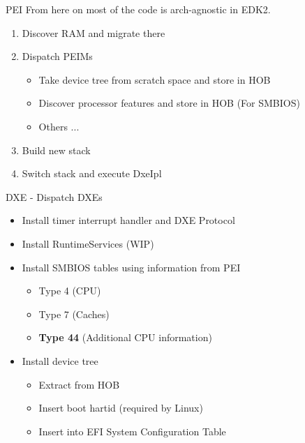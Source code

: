 \documentclass[
  10pt
]{beamer}
\begin{document}
\begin{frame}{PEI}
  From here on most of the code is arch-agnostic in EDK2.
  \vfill
  \begin{enumerate}
    \item Discover RAM and migrate there
    \item Dispatch PEIMs
      \begin{itemize}
        \item Take device tree from scratch space and store in HOB
        \item Discover processor features and store in HOB (For SMBIOS)
        \item Others ...
      \end{itemize}
    \item Build new stack
    \item Switch stack and execute DxeIpl
  \end{enumerate}
\end{frame}

\begin{frame}{DXE - Dispatch DXEs}
  \begin{itemize}
    \item Install timer interrupt handler and DXE Protocol
    \item Install RuntimeServices (WIP)
    \item Install SMBIOS tables using information from PEI
      \begin{itemize}
        \item Type 4 (CPU)
        \item Type 7 (Caches)
        \item \textbf{Type 44} (Additional CPU information)
      \end{itemize}
    \item Install device tree
      \begin{itemize}
        \item Extract from HOB
        \item Insert boot hartid (required by Linux)
        \item Insert into EFI System Configuration Table
      \end{itemize}
  \end{itemize}
\end{frame}
\end{document}
